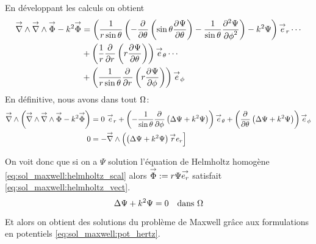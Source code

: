 %
En développant les calculs on obtient
\begin{align*}
  \vrot \vrot \vect \Phi - k^2 \vect \Phi
  &= \left(\frac{1}{r\sin\theta}\left(-\ddr{\theta}{}\left(\sin\theta\ddr{\theta}{\Psi}\right)-\frac{1}{\sin\theta}\ddr[2]{\phi}{\Psi}\right)-k^2\Psi\right)\vect e_r \cdots \\
  &+ \left(\frac{1}{r}\ddr{r}{}\left(r\ddr{\theta}{\Psi}\right)\right)\vect e_\theta \cdots \\
  &+ \left(\frac{1}{r\sin\theta}\ddr{r}{}\left(r\ddr{\phi}{\Psi}\right)\right)\vect e_\phi
\end{align*}
En définitive, nous avons dans tout \(\OO\):
\begin{align*}
  \vrot\left(\vrot \vrot \vect \Phi - k^2 \vect \Phi\right)
  &= %
   0 ~ \vect e_r
  + \left(-\frac{1}{\sin\theta}\ddr{\phi}{}\left(\Delta \Psi + k^2 \Psi \right)\right)\vect e_\theta
  + \left(\ddr{\theta}{}\left(\Delta \Psi + k^2 \Psi \right)\right)\vect e_\phi \\
  0 &= -\vrot \left( \left(\Delta \Psi + k^2\Psi\right)\vect r e_r\right]
\end{align*}

On voit donc que si on a \(\Psi\) solution l'équation de Helmholtz homogène  \eqref{eq:sol_maxwell:helmholtz_scal} alors  \(\vect \Phi:=r\Psi\vect{e_r}\) satisfait \eqref{eq:sol_maxwell:helmholtz_vect}.
\begin{equation}
  \label{eq:sol_maxwell:helmholtz_scal}
   \Delta \Psi + k^2\Psi = 0 \quad \text{dans \(\OO\)}
\end{equation}

Et alors on obtient des solutions du problème de Maxwell grâce aux formulations en potentiels \eqref{eq:sol_maxwell:pot_hertz}.
